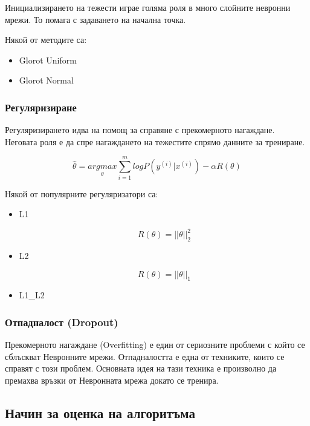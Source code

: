 \documentclass{article}
\begin{document}
Инициализирането на тежести играе голяма роля в много слойните невронни мрежи. То помага с задаването на начална точка.

Някой от методите са:

\begin{itemize}
  \item Glorot Uniform
  \item Glorot Normal
\end{itemize}

\subsubsection{Регуляризиране}

Регуляризирането идва на помощ за справяне с прекомерното нагаждане. Неговата роля е да спре нагаждането на тежестите
спрямо данните за трениране.

\begin{equation}
  \hat{\theta} = \underset{\theta}{argmax} \sum_{i=1}^m log P(y^{(i)}|x^{(i)}) - \alpha R(\theta)
\end{equation}

Някой от популярните регуляризатори са:

\begin{itemize}
  \item L1

    \begin{equation}
      R(\theta) = ||\theta||_2^2
    \end{equation}

  \item L2

    \begin{equation}
      R(\theta) = ||\theta||_1
    \end{equation}

  \item L1\_L2
\end{itemize}

\subsubsection{Отпадналост (Dropout)}

Прекомерното нагаждане (Overfitting) е един от сериозните проблеми с който се сблъскват Невронните мрежи. Отпадналостта
е една от техниките, които се справят с този проблем. Основната идея на тази техника е произволно да премахва връзки от
Невронната мрежа докато се тренира. \cite{dropout}

\subsection{Начин за оценка на алгоритъма}
\end{document}

